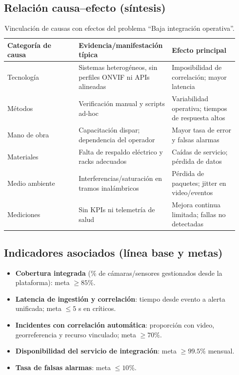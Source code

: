 \documentclass[12pt,a4paper]{article}
\begin{document}
\subsection*{Relación causa–efecto (síntesis)}
\begin{table}[htbp]
\centering
\caption{Vinculación de causas con efectos del problema “Baja integración operativa”.}
\begin{tabular}{p{0.30\linewidth} p{0.36\linewidth} p{0.28\linewidth}}
\hline
\textbf{Categoría de causa} & \textbf{Evidencia/manifestación típica} & \textbf{Efecto principal} \\
\hline
Tecnología & Sistemas heterogéneos, sin perfiles ONVIF ni APIs alineadas & Imposibilidad de correlación; mayor latencia \\
Métodos & Verificación manual y scripts ad-hoc & Variabilidad operativa; tiempos de respuesta altos \\
Mano de obra & Capacitación dispar; dependencia del operador & Mayor tasa de error y falsas alarmas \\
Materiales & Falta de respaldo eléctrico y racks adecuados & Caídas de servicio; pérdida de datos \\
Medio ambiente & Interferencias/saturación en tramos inalámbricos & Pérdida de paquetes; jitter en video/eventos \\
Mediciones & Sin KPIs ni telemetría de salud & Mejora continua limitada; fallas no detectadas \\
\hline
\end{tabular}
\end{table}

\subsection*{Indicadores asociados (línea base y metas)}
\begin{itemize}
    \item \textbf{Cobertura integrada} (\% de cámaras/sensores gestionados desde la plataforma): meta \(\geq 85\%\).
    \item \textbf{Latencia de ingestión y correlación}: tiempo desde evento a alerta unificada; meta \(\leq 5\) s en críticos.
    \item \textbf{Incidentes con correlación automática}: proporción con video, georreferencia y recurso vinculado; meta \(\geq 70\%\).
    \item \textbf{Disponibilidad del servicio de integración}: meta \(\geq 99.5\%\) mensual.
    \item \textbf{Tasa de falsas alarmas}: meta \(\leq 10\%\).
\end{itemize}
\end{document}
